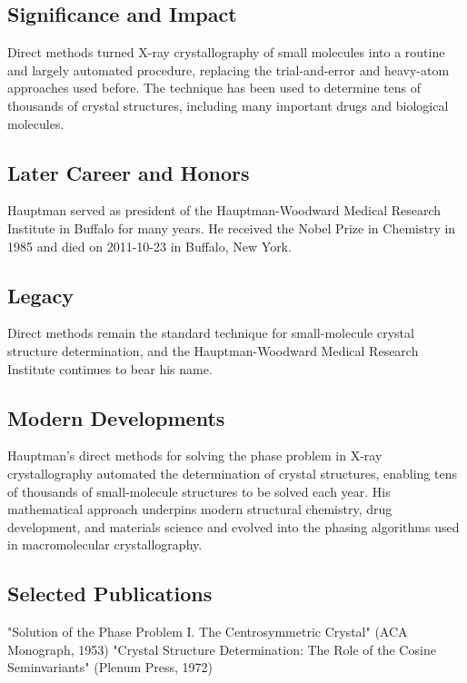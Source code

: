 \subsection*{Significance and Impact}

Direct methods turned X-ray crystallography of small molecules into a routine and largely automated procedure, replacing the trial-and-error and heavy-atom approaches used before. The technique has been used to determine tens of thousands of crystal structures, including many important drugs and biological molecules.

\subsection*{Later Career and Honors}

Hauptman served as president of the Hauptman-Woodward Medical Research Institute in Buffalo for many years. He received the Nobel Prize in Chemistry in 1985 and died on 2011-10-23 in Buffalo, New York.

\subsection*{Legacy}

Direct methods remain the standard technique for small-molecule crystal structure determination, and the Hauptman-Woodward Medical Research Institute continues to bear his name.

\subsection*{Modern Developments}

Hauptman's direct methods for solving the phase problem in X-ray crystallography automated the determination of crystal structures, enabling tens of thousands of small-molecule structures to be solved each year. His mathematical approach underpins modern structural chemistry, drug development, and materials science and evolved into the phasing algorithms used in macromolecular crystallography.

\subsection*{Selected Publications}

"Solution of the Phase Problem I. The Centrosymmetric Crystal" (ACA Monograph, 1953)
"Crystal Structure Determination: The Role of the Cosine Seminvariants" (Plenum Press, 1972)

